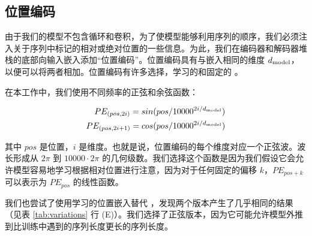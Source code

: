 \subsection{位置编码}
由于我们的模型不包含循环和卷积，为了使模型能够利用序列的顺序，我们必须注入关于序列中标记的相对或绝对位置的一些信息。为此，我们在编码器和解码器堆栈的底部向输入嵌入添加``位置编码''。位置编码具有与嵌入相同的维度 $d_{\text{model}}$，以便可以将两者相加。位置编码有许多选择，学习的和固定的 \citep{JonasFaceNet2017}。

在本工作中，我们使用不同频率的正弦和余弦函数：

\begin{align*}
    PE_{(pos,2i)} = sin(pos / 10000^{2i/d_{\text{model}}}) \\
    PE_{(pos,2i+1)} = cos(pos / 10000^{2i/d_{\text{model}}})
\end{align*}

其中 $pos$ 是位置，$i$ 是维度。也就是说，位置编码的每个维度对应一个正弦波。波长形成从 $2\pi$ 到 $10000 \cdot 2\pi$ 的几何级数。我们选择这个函数是因为我们假设它会允许模型容易地学习根据相对位置进行注意，因为对于任何固定的偏移 $k$，$PE_{pos+k}$ 可以表示为 $PE_{pos}$ 的线性函数。

我们也尝试了使用学习的位置嵌入替代 \citep{JonasFaceNet2017}，发现两个版本产生了几乎相同的结果（见表 \ref{tab:variations} 行 (E)）。我们选择了正弦版本，因为它可能允许模型外推到比训练中遇到的序列长度更长的序列长度。

